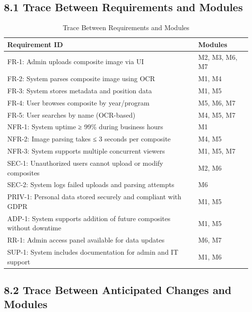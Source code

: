 \documentclass[12pt, titlepage]{article}
\begin{document}
\subsection{8.1 Trace Between Requirements and Modules}

\begin{table}[H]
\centering
\caption{Trace Between Requirements and Modules}
\begin{tabular}{|l|p{10cm}|}
\hline
\textbf{Requirement ID} & \textbf{Modules} \\
\hline
FR-1: Admin uploads composite image via UI & M2, M3, M6, M7 \\
FR-2: System parses composite image using OCR & M1, M4 \\
FR-3: System stores metadata and position data & M1, M5 \\
FR-4: User browses composite by year/program & M5, M6, M7 \\
FR-5: User searches by name (OCR-based) & M4, M5, M7 \\
NFR-1: System uptime ≥ 99\% during business hours & M1 \\
NFR-2: Image parsing takes ≤ 3 seconds per composite & M4, M5 \\
NFR-3: System supports multiple concurrent viewers & M1, M5, M7 \\
SEC-1: Unauthorized users cannot upload or modify composites & M2, M6 \\
SEC-2: System logs failed uploads and parsing attempts & M6 \\
PRIV-1: Personal data stored securely and compliant with GDPR & M1, M5 \\
ADP-1: System supports addition of future composites without downtime & M1, M5 \\
RR-1: Admin access panel available for data updates & M6, M7 \\
SUP-1: System includes documentation for admin and IT support & M1, M6 \\
\hline
\end{tabular}
\end{table}

\vspace{1em}

\subsection{8.2 Trace Between Anticipated Changes and Modules}
\end{document}
